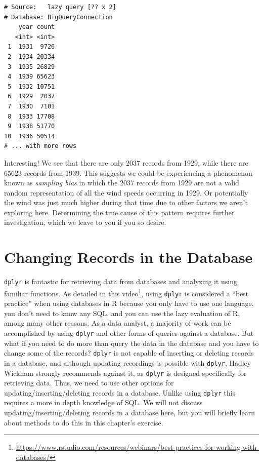 \documentclass[
]{krantz}
\renewcommand{\href}[2]{#2\footnote{\url{#1}}}
\begin{document}
\begin{verbatim}
# Source:   lazy query [?? x 2]
# Database: BigQueryConnection
    year count
   <int> <int>
 1  1931  9726
 2  1934 20334
 3  1935 26829
 4  1939 65623
 5  1932 10751
 6  1929  2037
 7  1930  7101
 8  1933 17708
 9  1938 51770
10  1936 50514
# ... with more rows
\end{verbatim}

Interesting! We see that there are only 2037 records from 1929, while there are 65623 records from 1939. This suggests we could be experiencing a phenomenon known as \emph{sampling bias} in which the 2037 records from 1929 are not a valid random representation of all the wind speeds occurring in 1929. Or potentially the wind was just much higher during that time due to other factors we aren't exploring here. Determining the true cause of this pattern requires further investigation, which we leave to you if you so desire.

\hypertarget{changing-records-in-the-database}{%
\section{Changing Records in the Database}\label{changing-records-in-the-database}}

\texttt{dplyr} is fantastic for retrieving data from databases and analyzing it using familiar functions. As detailed in this \href{https://www.rstudio.com/resources/webinars/best-practices-for-working-with-databases/}{video}, using \texttt{dplyr} is considered a ``best practice'' when using databases in R because you only have to use one language, you don't need to know any SQL, and you can use the lazy evaluation of R, among many other reasons. As a data analyst, a majority of work can be accomplished by using \texttt{dplyr} and other forms of queries against a database. But what if you need to do more than query the data in the database and you have to change some of the records? \texttt{dplyr} is not capable of inserting or deleting records in a database, and although updating recordings is possible with \texttt{dplyr}, Hadley Wickham strongly recommends against it, as \texttt{dplyr} is designed specifically for retrieving data. Thus, we need to use other options for updating/inserting/deleting records in a database. Unlike using \texttt{dplyr} this requires a more in depth knowledge of SQL. We will not discuss updating/inserting/deleting records in a database here, but you will briefly learn about methods to do this in this chapter's exercise.
\end{document}
